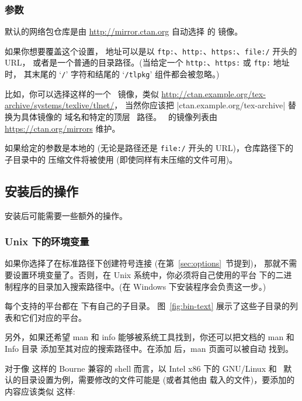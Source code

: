 \documentclass{article}
\begin{document}
\subsubsection{ 参数}
\label{sec:location}

默认的网络包仓库是由 \url{http://mirror.ctan.org} 自动选择
的 \CTAN{} 镜像。

如果你想要覆盖这个设置，
地址可以是以 \texttt{ftp:}、\texttt{http:}、\texttt{https:}、\texttt{file:/} 开头的 URL，
或者是一个普通的目录路径。(当给定一个 \texttt{http:}、\texttt{https:} 或 \texttt{ftp:} 地址时，
其末尾的 `\texttt{/}' 字符和结尾的 `\texttt{/tlpkg}' 组件都会被忽略。)

比如，你可以选择这样的一个 \CTAN\ 镜像，类似
\url{http://ctan.example.org/tex-archive/systems/texlive/tlnet/}，
当然你应该把 |ctan.example.org/tex-archive| 替换为具体镜像的
域名和特定的顶层 \CTAN\ 路径。
\CTAN\ 的镜像列表由 \url{https://ctan.org/mirrors} 维护。

如果给定的参数是本地的 (无论是路径还是 \texttt{file:/}
开头的 URL)，仓库路径下的  子目录中的
压缩文件将被使用 (即使同样有未压缩的文件可用)。

\subsection{安装后的操作}
\label{sec:postinstall}

安装后可能需要一些额外的操作。

\subsubsection{Unix 下的环境变量}
\label{sec:env}

如果你选择了在标准路径下创建符号连接 (在第~\ref{sec:options}~节提到)，
那就不需要设置环境变量了。否则，在 Unix 系统中，你必须将自己使用的平台
下的二进制程序的目录加入搜索路径中。(在 Windows 下安装程序会负责这一步。)

每个支持的平台都在  下有自己的子目录。
图~\ref{fig:bin-text} 展示了这些子目录的列表和它们对应的平台。

另外，如果还希望 man 和 info 能够被系统工具找到，你还可以把文档的 man 和 Info 目录
添加至其对应的搜索路径中。在添加  后，man 页面可以被自动
找到。

对于像  这样的 Bourne 兼容的 shell 而言，以 Intel x86 下的
GNU/Linux 和 \TL\ 默认的目录设置为例，需要修改的文件可能是 
(或者其他由  载入的文件)，要添加的内容应该类似
这样: 
\end{document}
